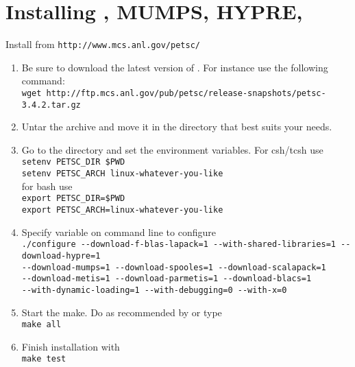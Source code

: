 \documentclass{book}
\begin{document}
\section{Installing \petsc, MUMPS, HYPRE, \etc}
Install \petsc from \verb?http://www.mcs.anl.gov/petsc/?
\begin{enumerate}
\item Be sure to download the latest version of  \petsc.
For instance use the following command:\\
\verb?wget http://ftp.mcs.anl.gov/pub/petsc/release-snapshots/petsc-3.4.2.tar.gz?  
\item Untar the archive and move it
in the directory that best suits your needs.
\item Go to the \petsc directory and set the environment variables. For 
csh/tcsh use\\
\verb?setenv PETSC_DIR $PWD?\\
\verb?setenv PETSC_ARCH linux-whatever-you-like?\\
for bash use \\
\verb?export PETSC_DIR=$PWD?\\
\verb?export PETSC_ARCH=linux-whatever-you-like?
\item Specify variable on command line to configure\\
\verb?./configure --download-f-blas-lapack=1 --with-shared-libraries=1 --download-hypre=1?\\
\verb?--download-mumps=1 --download-spooles=1 --download-scalapack=1?\\
\verb?--download-metis=1 --download-parmetis=1 --download-blacs=1?\\
\verb?--with-dynamic-loading=1 --with-debugging=0 --with-x=0?
\item Start the make. Do as recommended by \petsc or type\\
\verb?make all?
\item Finish installation with\\
\verb?make test?
\end{enumerate}
\end{document}
